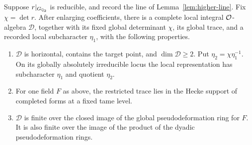 \begin{lemma}\label{lem:ordinary-character-family}
Suppose $r|_{G_{\mathbb Q_2}}$ is reducible, and record the line of
Lemma~\ref{lem:higher-line}.  Fix $\chi=\det r$.
After enlarging coefficients, there is a
complete local integral $\mathcal O$-algebra $\mathscr D$, together with its
fixed global determinant $\chi$, its global trace, and a recorded local subcharacter
$\eta_1$, with the following properties.
\begin{enumerate}
\item $\mathscr D$ is horizontal, contains the target point, and
      $\dim\mathscr D\ge2$.  Put $\eta_2=\chi\eta_1^{-1}$.
      On its globally absolutely irreducible locus the local
      representation has subcharacter $\eta_1$ and quotient $\eta_2$.
\item For one field $F$ as above, the restricted trace lies in the
      Hecke support of completed forms at a fixed tame level.
\item $\mathscr D$ is finite over the closed image of the global
      pseudodeformation ring for $F$.  It is also finite over the
      image of the product of the dyadic pseudodeformation rings.
\end{enumerate}
\end{lemma}
